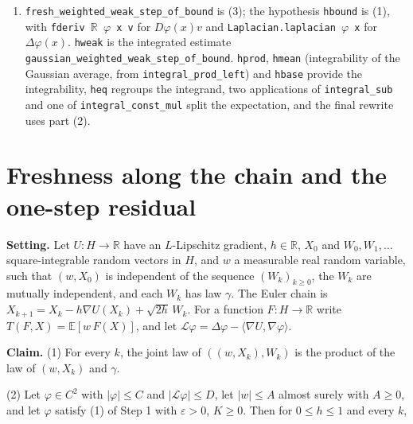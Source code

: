 \documentclass[11pt,a4paper]{article}
\begin{document}
\begin{leanbox}
\begin{enumerate}
\item \texttt{fresh\_\allowbreak{}weighted\_\allowbreak{}weak\_\allowbreak{}step\_\allowbreak{}of\_\allowbreak{}bound} is (3); the hypothesis \texttt{hbound} is (1), with \texttt{fderiv \ensuremath{\mathbb R} \ensuremath{\varphi} x v} for \(D\varphi(x)v\) and \texttt{Laplacian.\allowbreak{}laplacian \ensuremath{\varphi} x} for \(\Delta\varphi(x)\). \texttt{hweak} is the integrated estimate \texttt{gaussian\_\allowbreak{}weighted\_\allowbreak{}weak\_\allowbreak{}step\_\allowbreak{}of\_\allowbreak{}bound}. \texttt{hprod}, \texttt{hmean} (integrability of the Gaussian average, from \texttt{integral\_\allowbreak{}prod\_\allowbreak{}left}) and \texttt{hbase} provide the integrability, \texttt{heq} regroups the integrand, two applications of \texttt{integral\_\allowbreak{}sub} and one of \texttt{integral\_\allowbreak{}const\_\allowbreak{}mul} split the expectation, and the final rewrite uses part (2).

\end{enumerate}
\end{leanbox}

\section{\texorpdfstring{Freshness along the chain and the one-step residual}{Freshness along the chain and the one-step residual}}


\textbf{Setting.} Let \(U:H\to\mathbb R\) have an \(L\)-Lipschitz gradient, \(h\in\mathbb R\), \(X_0\) and \(W_0,W_1,\dots\) square-integrable random vectors in \(H\), and \(w\) a measurable real random variable, such that \((w,X_0)\) is independent of the sequence \((W_k)_{k\ge0}\), the \(W_k\) are mutually independent, and each \(W_k\) has law \(\gamma\). The Euler chain is \(X_{k+1}=X_k-h\nabla U(X_k)+\sqrt{2h}\,W_k\). For a function \(F:H\to\mathbb R\) write \(T(F,X)=\mathbb E[w\,F(X)]\), and let \(\mathcal L\varphi=\Delta\varphi-\langle\nabla U,\nabla\varphi\rangle\).




\textbf{Claim.} (1) For every \(k\), the joint law of \(((w,X_k),W_k)\) is the product of the law of \((w,X_k)\) and \(\gamma\).




(2) Let \(\varphi\in C^2\) with \(|\varphi|\le C\) and \(|\mathcal L\varphi|\le D\), let \(|w|\le A\) almost surely with \(A\ge0\), and let \(\varphi\) satisfy (1) of Step 1 with \(\varepsilon>0\), \(K\ge0\). Then for \(0\le h\le1\) and every \(k\),
\end{document}
